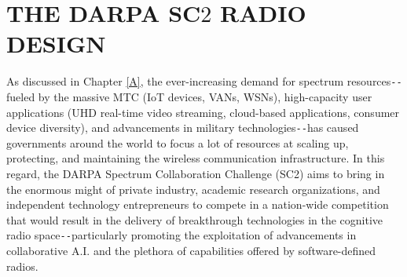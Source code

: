 \chapter{THE DARPA SC$2$ RADIO DESIGN}\label{B}
As discussed in Chapter \ref{A}, the ever-increasing demand for spectrum resources\texttt{-{}-}fueled by the massive MTC (IoT devices, VANs, WSNs), high-capacity user applications (UHD real-time video streaming, cloud-based applications, consumer device diversity), and advancements in military technologies\texttt{-{}-}has caused governments around the world to focus a lot of resources at scaling up, protecting, and maintaining the wireless communication infrastructure. In this regard, the DARPA Spectrum Collaboration Challenge (SC2) aims to bring in the enormous might of private industry, academic research organizations, and independent technology entrepreneurs to compete in a nation-wide competition that would result in the delivery of breakthrough technologies in the cognitive radio space\texttt{-{}-}particularly promoting the exploitation of advancements in collaborative A.I. and the plethora of capabilities offered by software-defined radios.


